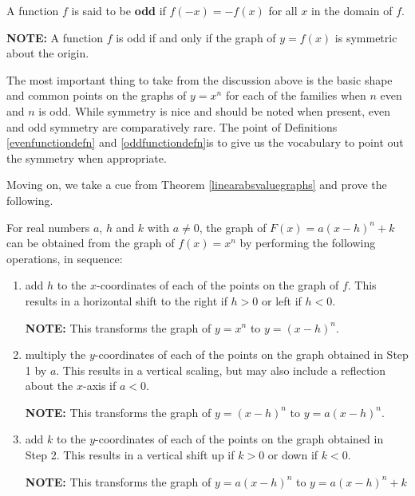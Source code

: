 \medskip

\colorbox{ResultColor}{\bbm

\begin{defn} \label{oddfunctiondefn} A function $f$ is said to be \textbf{odd} if $f(-x) = -f(x)$ for all $x$ in the domain of $f$.  

\textbf{NOTE:} A function $f$ is odd if and only if  the graph of  $y = f(x)$ is symmetric about the origin.

\end{defn}

\ebm}

\medskip

The most important thing to take from the discussion above is the basic shape and common points on the graphs of $y = x^n$ for each of the families when $n$ even and $n$ is odd.  While symmetry is nice and should be noted when present, even and odd symmetry are comparatively rare.  The point of Definitions \ref{evenfunctiondefn}  and \ref{oddfunctiondefn}is to give us the vocabulary to point out the symmetry when appropriate.  

\medskip

Moving on, we take a cue from Theorem  \ref{linearabsvaluegraphs} and prove the following.

\medskip

\colorbox{ResultColor}{\bbm

\begin{thm} \label{linearmononialgraphs}  For real numbers $a$, $h$ and $k$ with $a \neq 0$, the graph of $F(x) = a(x-h)^n+k$  can be obtained from the graph of $f(x) = x^n$ by performing the following operations, in sequence:

\begin{enumerate}

\item  add $h$ to the $x$-coordinates of each of the points on the graph of $f$.  This results in a horizontal shift to the right if $h > 0$ or left if $h < 0$.

\textbf{NOTE:}  This transforms the graph of $y = x^n$ to $y = (x-h)^n$.

\item  multiply the $y$-coordinates of each of the points on the graph obtained in Step 1 by $a$.   This results in a vertical scaling, but may also include a reflection about the $x$-axis if $a < 0$.

\textbf{NOTE:}  This transforms the graph of $y = (x-h)^n$ to $y = a(x-h)^n$.

\item  add $k$ to the $y$-coordinates of each of the points on the graph obtained in Step 2.  This results in a vertical shift up if $k > 0$ or down if $k< 0$.

\textbf{NOTE:}  This transforms the graph of  $y = a(x-h)^n$ to $y = a(x-h)^n+k$

\end{enumerate}

\end{thm}

\ebm}

